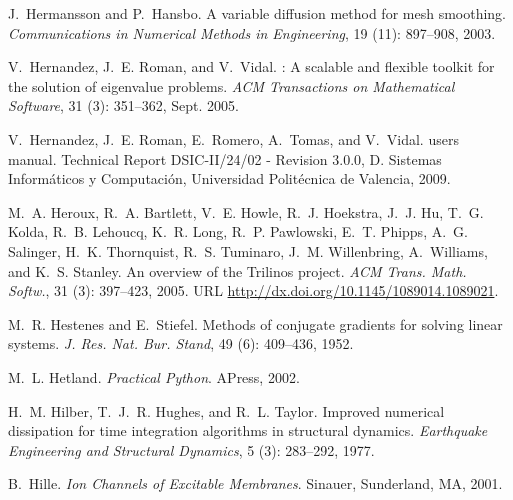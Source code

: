 \begin{thebibliography}{467}
J.~Hermansson and P.~Hansbo.
\newblock A variable diffusion method for mesh smoothing.
\newblock \emph{Communications in Numerical Methods in Engineering},
  19 (11): 897--908, 2003.

V.~Hernandez, J.~E. Roman, and V.~Vidal.
: A scalable and flexible toolkit for the solution of
  eigenvalue problems.
\newblock \emph{ACM Transactions on Mathematical Software}, 31
  (3): 351--362, Sept. 2005.

V.~Hernandez, J.~E. Roman, E.~Romero, A.~Tomas, and V.~Vidal.
 users manual.
\newblock Technical Report DSIC-II/24/02 - Revision 3.0.0, D. Sistemas
  Inform\'aticos y Computaci\'on, Universidad Polit\'ecnica de Valencia, 2009.

M.~A. Heroux, R.~A. Bartlett, V.~E. Howle, R.~J. Hoekstra, J.~J. Hu, T.~G.
  Kolda, R.~B. Lehoucq, K.~R. Long, R.~P. Pawlowski, E.~T. Phipps, A.~G.
  Salinger, H.~K. Thornquist, R.~S. Tuminaro, J.~M. Willenbring, A.~Williams,
  and K.~S. Stanley.
\newblock An overview of the {T}rilinos project.
\newblock \emph{ACM Trans. Math. Softw.}, 31 (3): 397--423,
  2005.
\newblock URL \url{http://dx.doi.org/10.1145/1089014.1089021}.

M.~R. Hestenes and E.~Stiefel.
\newblock Methods of conjugate gradients for solving linear systems.
\newblock \emph{J. Res. Nat. Bur. Stand}, 49 (6): 409--436,
  1952.

M.~L. Hetland.
\newblock \emph{Practical Python}.
\newblock APress, 2002.

H.~M. Hilber, T.~J.~R. Hughes, and R.~L. Taylor.
\newblock Improved numerical dissipation for time integration algorithms in
  structural dynamics.
\newblock \emph{Earthquake Engineering and Structural Dynamics}, 5
  (3): 283--292, 1977.

B.~Hille.
\newblock \emph{Ion Channels of Excitable Membranes}.
\newblock Sinauer, Sunderland, MA, 2001.


\end{thebibliography}
